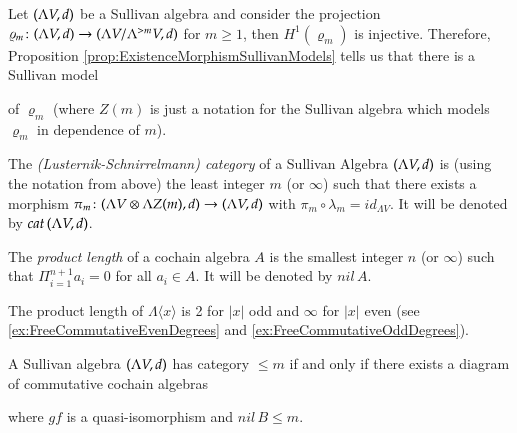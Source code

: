 \par

Let $(\Lambda V,d)$ be a Sullivan algebra and consider the projection 
$\varrho_m \colon (\Lambda V,d) \to (\Lambda V / \Lambda^{> m} V , d)$ for $m \geq 1$, then $H^1(\varrho_m)$ is injective.
Therefore, Proposition \ref{prop:ExistenceMorphismSullivanModels} tells us that there is a Sullivan model

\centerline{
}

of $\varrho_m$ (where $Z(m)$ is just a notation for the Sullivan algebra which models $\varrho_m$ in dependence of $m$).

\begin{Definition}
\label{def:LSCategory}
 The \emph{(Lusternik-Schnirrelmann) category} of a Sullivan Algebra $(\Lambda V,d)$ is (using the notation from above) the 
 least integer $m$ (or $\infty$) such that there exists a morphism 
 $\pi_m \colon (\Lambda V \otimes \Lambda Z(m) , d) \to (\Lambda V,d)$ with $\pi_m \circ \lambda_m = id_{\Lambda V}$.
 It will be denoted by $cat \, (\Lambda V,d)$.
\end{Definition}

\begin{Definition}
 The \emph{product length} of a cochain algebra $A$ is the smallest integer $n$ (or $\infty$) such that 
 $\Pi_{i = 1}^{n+1} a_i = 0$  for all $a_i \in A$. It will be denoted by $nil \,A$.
\end{Definition}

\begin{Example}
 The product length of $\Lambda \langle x \rangle$ is 2 for $|x|$ odd and $\infty$ for $|x|$ even
 (see \ref{ex:FreeCommutativeEvenDegrees} and \ref{ex:FreeCommutativeOddDegrees}).
\end{Example}

\begin{Proposition}
  A Sullivan algebra $(\Lambda V,d)$ has category $ \leq m$ if and only if there exists a diagram of commutative cochain
  algebras 
  
  \centerline{
  }
  
  where $gf$ is a quasi-isomorphism and $nil \,B \leq m$.
\end{Proposition}

